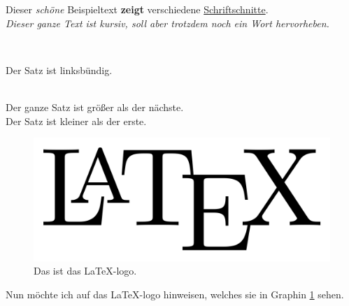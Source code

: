 \documentclass[twoside]{report}
\begin{document}
\raggedright{}
Dieser \textit{schöne} Beispieltext \textbf{zeigt} verschiedene \underline{Schriftschnitte}.\\
\textit{Dieser ganze Text ist kursiv, soll aber trotzdem noch ein \emph{Wort} hervorheben.}\\

\vspace{1cm}

\\

\raggedright{Der Satz ist linksbündig.}\\

\\
\raggedright{}

\vspace{1cm}

\pagestyle{fancy}
\cfoot{}

\large{Der ganze Satz ist größer als der nächste.}\\

\small{Der Satz ist kleiner als der erste.}

\vspace{1cm}

\begin{figure}[h]
    \centering
    \includegraphics[width=\textwidth]{Bild1/LaTeX1.png}
    \caption{Das ist das \LaTeX{}-logo.}
    \label{fig:LaTeX1.png}
\end{figure}
Nun möchte ich auf das \LaTeX{}-logo hinweisen, welches sie in Graphin \ref{fig:LaTeX1.png} sehen.\\
\end{document}
